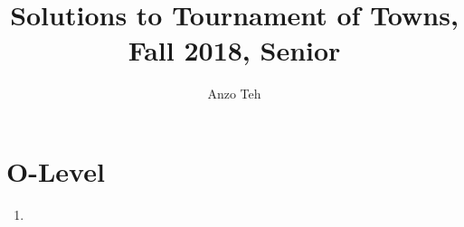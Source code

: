 \documentclass[11pt,a4paper]{article}
\begin{document}
\newcommand{\la}{\leftarrow}
\newcommand{\lra}{\leftrightarrow}
\newcommand{\bbN}{\mathbb{N}}
\newcommand{\bbZ}{\mathbb{Z}}
\newcommand{\dsum}{\displaystyle\sum}
\newcommand{\dprod}{\displaystyle\prod}


\title{Solutions to Tournament of Towns, Fall 2018, Senior}
\author{Anzo Teh}
\date{}
\maketitle

\section*{O-Level}
\begin{enumerate}
	\item
\end{enumerate}
\end{document}
